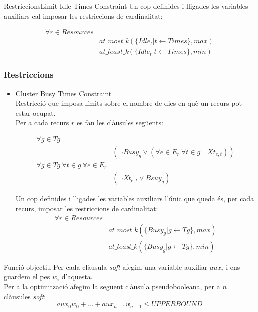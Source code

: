 \documentclass[13pt]{beamer}
\begin{document}
      \begin{frame}{Restriccions}{Limit Idle Times Constraint}
       Un cop definides i lligades les variables auxiliars cal imposar les restriccions de cardinalitat:
    
       \begin{align*}
        \forall r \in Resources &\\
        & at\_most\_k(\{ Idle_t | t \leftarrow Times\}, max) \\
        & at\_least\_k(\{ Idle_t | t \leftarrow Times\}, min)
       \end{align*}
  
  \end{frame}
  \begin{frame}
    \frametitle{Restriccions}

    \begin{itemize}
    
      \item Cluster Busy Times Constraint \\
      Restricció que imposa límits sobre el nombre de dies en què un recurs pot estar ocupat.\\
      Per a cada recurs $r$ es fan les clàusules següents:
      
      \begin{align*}
        \forall g \in Tg & \\
        &(\neg Busy_g \lor (\forall e \in E_r \ \forall t \in g \quad Xt_{e,t}))\\
        \forall g \in Tg \ \forall t \in g \ \forall e \in E_r &\\
        & (\neg Xt_{e,t} \lor Bsuy_g)
      \end{align*}
    
      Un cop definides i lligades les variables auxiliars l'únic que queda és, per cada recurs, imposar les restriccions de cardinalitat:
      \begin{align*}
        \forall r \in Resources &\\
        & at\_most\_k(\{ Busy_g | g \leftarrow Tg\}, max) \\
        & at\_least\_k(\{ Busy_g | g \leftarrow Tg\}, min)
       \end{align*}
          
    \end{itemize}
  
  \end{frame}

  \begin{frame}{Funció objectiu}
    Per cada clàusula \textit{soft} afegim una variable auxiliar $aux_i$ i ens guardem el pes $w_i$ d'aquesta.
    \\ Per a la optimització afegim la següent clàusula pseudobooleana, per a $n$ clàusules 
    \textit{soft}:\\ \[
        aux_{0}w_{0} + . . .  + aux_{n-1}w_{n-1} \leq UPPERBOUND
    \]
  
  \end{frame}
\end{document}
